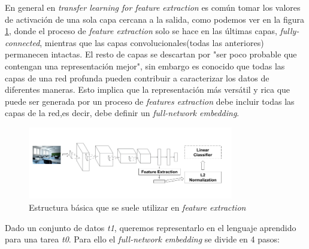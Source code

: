 \documentclass[12,twoside]{TFG-GM}
\theoremstyle{definition}
\theoremstyle{remark}
\begin{document}
En general en \textit{transfer learning for feature extraction} es común tomar los valores de activación de una sola capa cercana a la salida, como podemos ver en la figura \ref{fig:base}, donde el proceso de \textit{feature extraction} solo se hace en las últimas capas, \textit{fully-connected}, mientras que las capas convolucionales(todas las anteriores) permanecen intactas. El resto de capas se descartan por 
"ser poco probable que contengan una representación mejor"\cite{onlylastlayers}, sin embargo es conocido que todas las capas de una red profunda pueden contribuir a caracterizar los datos de diferentes maneras. Esto implica que la representación más versátil y rica que puede ser generada por un proceso de \textit{features extraction} debe incluir todas las capas de la red,es decir, debe definir un \textit{full-network embedding}. 
\begin{figure}[H]
\centering
\includegraphics[width = 0.8\textwidth]{Images/basecrop.png} 
\caption{Estructura básica que se suele utilizar en \textit{feature extraction}
\label{fig:base}}
\end{figure}
Dado un conjunto de datos \textit{t1}, queremos representarlo en el lenguaje aprendido para una tarea \textit{t0}. Para ello el \textit{full-network embedding} se divide en 4 pasos: 
\end{document}
